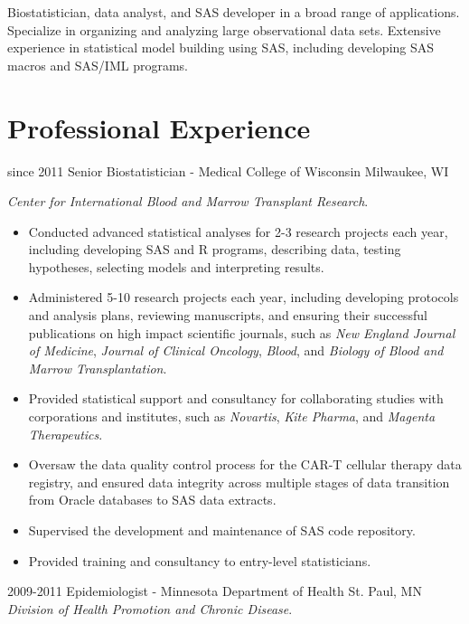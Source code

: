 Biostatistician, data analyst, and SAS developer in a broad range of applications. Specialize in organizing and analyzing large observational data sets. Extensive experience in statistical model building using SAS, including developing SAS macros and SAS/IML programs.\\

\section{Professional Experience}

\begin{entrylist}
  \entry
    {since 2011}
    {Senior Biostatistician - Medical College of Wisconsin}
    {Milwaukee, WI}
    {
    \textit{Center for International Blood and Marrow Transplant Research}.
    \begin{itemize}
      \item Conducted advanced statistical analyses for 2-3 research projects each year, including developing SAS and R programs, describing data, testing hypotheses, selecting models and interpreting results.
      \item Administered 5-10 research projects each year, including developing protocols and analysis plans, reviewing manuscripts, and ensuring their successful publications on high impact scientific journals, such as \textit{New England Journal of Medicine}, \textit{Journal of Clinical Oncology}, \textit{Blood}, and \textit{Biology of Blood and Marrow Transplantation}.
      \item Provided statistical support and consultancy for collaborating studies with corporations and institutes, such as \textit{Novartis}, \textit{Kite Pharma}, and \textit{Magenta Therapeutics}.
      \item Oversaw the data quality control process for the CAR-T cellular therapy data registry, and ensured data integrity across multiple stages of data transition from Oracle databases to SAS data extracts.
      \item Supervised the development and maintenance of SAS code repository.
      \item Provided training and consultancy to entry-level statisticians.
    \end{itemize}
    }
  \entry
    {2009-2011}
    {Epidemiologist - Minnesota Department of Health}
    {St. Paul, MN}
    {
    \textit{Division of Health Promotion and Chronic Disease}.
}
\end{entrylist}
